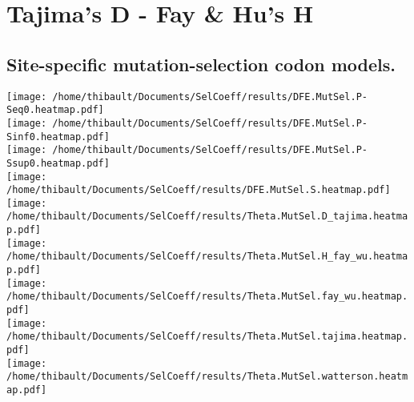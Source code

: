 \section{Tajima's D - Fay \& Hu's H} 
 
\subsection{Site-specific mutation-selection codon models.} 
\begin{center}
\texttt{[image: /home/thibault/Documents/SelCoeff/results/DFE.MutSel.P-Seq0.heatmap.pdf]} \\
\texttt{[image: /home/thibault/Documents/SelCoeff/results/DFE.MutSel.P-Sinf0.heatmap.pdf]} \\
\texttt{[image: /home/thibault/Documents/SelCoeff/results/DFE.MutSel.P-Ssup0.heatmap.pdf]} \\
\texttt{[image: /home/thibault/Documents/SelCoeff/results/DFE.MutSel.S.heatmap.pdf]} \\
\texttt{[image: /home/thibault/Documents/SelCoeff/results/Theta.MutSel.D\_tajima.heatmap.pdf]} \\
\texttt{[image: /home/thibault/Documents/SelCoeff/results/Theta.MutSel.H\_fay\_wu.heatmap.pdf]} \\
\texttt{[image: /home/thibault/Documents/SelCoeff/results/Theta.MutSel.fay\_wu.heatmap.pdf]} \\
\texttt{[image: /home/thibault/Documents/SelCoeff/results/Theta.MutSel.tajima.heatmap.pdf]} \\
\texttt{[image: /home/thibault/Documents/SelCoeff/results/Theta.MutSel.watterson.heatmap.pdf]} \\
\end{center}
